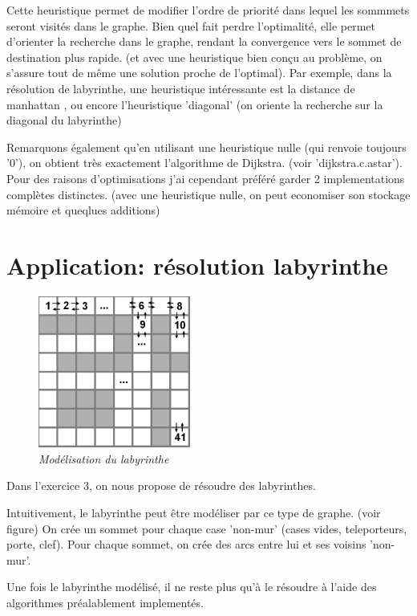 \documentclass[10pt]{article}
\begin{document}
			Cette heuristique permet de modifier l'ordre de priorité dans lequel les sommmets seront visités dans le graphe.
			Bien quel fait perdre l'optimalité, elle permet d'orienter la recherche dans le graphe, rendant la convergence vers
			le sommet de destination plus rapide.
			(et avec une heuristique bien conçu au problème, on s'assure tout de même une solution proche de l'optimal).
			Par exemple, dans la résolution de labyrinthe, une heuristique intéressante est la distance de manhattan \cite{manhattan},
			ou encore l'heuristique 'diagonal' (on oriente la recherche sur la diagonal du labyrinthe)
			
			Remarquons également qu'en utilisant une heuristique nulle (qui renvoie toujours '0'),
			on obtient très exactement l'algorithme de Dijkstra. (voir 'dijkstra.c.astar').
			Pour des raisons d'optimisations j'ai cependant préféré garder 2 implementations complètes distinctes.
			(avec une heuristique nulle, on peut economiser son stockage mémoire et queqlues additions)

	\newpage
	\section{Application: résolution labyrinthe}
	
		\begin{figure}
			\includegraphics[width=5cm]{./images/lab.png}
			\caption{\textit{Modélisation du labyrinthe}}
		\end{figure}
		
		Dans l'exercice 3, on nous propose de résoudre des labyrinthes.\newline
		
		Intuitivement, le labyrinthe peut être modéliser par ce type de graphe. (voir figure)
		On crée un sommet pour chaque case 'non-mur' (cases vides, teleporteurs, porte, clef).
		Pour chaque sommet, on crée des arcs entre lui et ses voisins 'non-mur'.\newline
		
		Une fois le labyrinthe modélisé, il ne reste plus qu'à le résoudre à l'aide des algorithmes préalablement implementés.\newline
		
\end{document}
